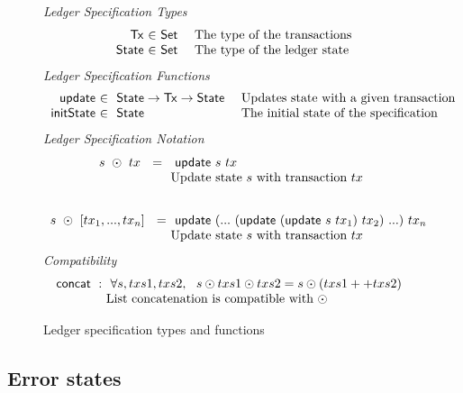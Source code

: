 \begin{figure*}[htb]
  \emph{Ledger Specification Types}
  \begin{equation*}
    \begin{array}{r@{~\in~}l@{~~~~}lr}
      \Tx
      & \Set
      & \text{The type of the transactions} \\
      \State
      & \Set
      & \text{The type of the ledger state} \\
    \end{array}
  \end{equation*}
  \emph{Ledger Specification Functions}
  \begin{equation*}
    \begin{array}{r@{~\in~}l@{~~~~}lr}
    \ups & ~\type{State} \to \type{Tx} \to \type{State}
    & \text{Updates state with a given transaction} \\
    \fun{initState} & ~\type{State}
    & \text{The initial state of the specification} \\
    \end{array}
  \end{equation*}
  \emph{Ledger Specification Notation}
  \begin{equation*}
    \begin{array}{r@{~}l@{~~~~}lr}
    s~\odot~tx~ ~=~&~ \ups~s~tx  \\
    & \text{Update state $s$ with transaction $tx$} \\
    \nextdef
    s~\odot~[tx_1, ... , tx_n]~~= &~ \ups~(...~ (\ups~(\ups~s~tx_1)~tx_2) ~...)~ tx_n \\
    & \text{Update state $s$ with transaction $tx$} \\
    \end{array}
  \end{equation*}
  \emph{Compatibility}
  \begin{equation*}
    \begin{array}{r@{}l@{~~~~}lr}
    \fun{concat}~:~&~ \forall s, txs1, txs2,~~s \odot txs1 \odot txs2 = s \odot (txs1 ++ txs2)  \\
    & \text{List concatenation is compatible with $\odot$} \\
    \end{array}
  \end{equation*}
  \caption{Ledger specification types and functions}
  \label{fig:ledger-spec}
\end{figure*}

\subsection{Error states}
\label{sec:errors}

